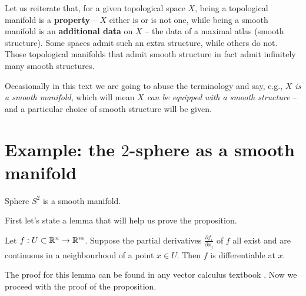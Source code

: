 \documentclass[11pt,a4paper]{report}
\begin{document}
     Let us reiterate that, for a given topological space $X$, being a topological manifold is a \textbf{property} -- $X$ either is or is not one, 
     while being a smooth manifold is an \textbf{additional data} on $X$ -- the data of a maximal atlas (smooth structure).
     Some spaces admit such an extra structure, while others do not.  Those topological manifolds that admit smooth structure in fact admit infinitely many
     smooth structures.
     
     Occasionally in this text we are going to abuse the terminology and say, e.g., \emph{$X$ is a smooth manifold}, which will mean \emph{$X$ can be equipped
     with a smooth structure} -- and a particular choice of smooth structure will be given.
     
      
	

\section{Example: the $2$-sphere as a smooth manifold}
\begin{Prop}
    Sphere $S^2$ is a smooth manifold. 
\end{Prop}
\noindent First let's state a lemma that will help us prove the proposition.
\begin{Lemma}\label{contLemma}
  Let $f:U \subset \mathbb{R}^n \to \mathbb{R}^m $. Suppose the partial derivatives $\frac{\partial f_i}{\partial x_j}$ of $f$ all exist
  and are continuous in a neighbourhood of a point $x \in U$. Then $f$ is differentiable at $x$. 
\end{Lemma}
\noindent The proof for this lemma can be found in any vector calculus textbook \cite{3251}. Now we proceed with the proof of the proposition.
\end{document}
